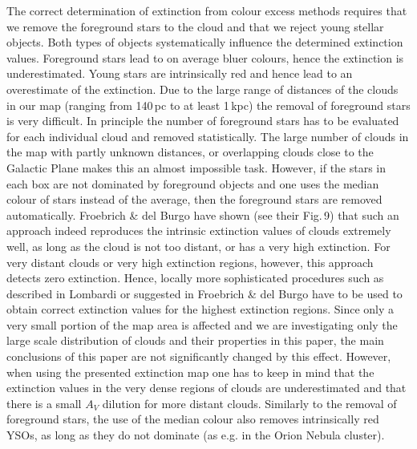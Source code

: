 \documentclass[useAMS,usenatbib]{mn2e}
\begin{document}
The correct determination of extinction from colour excess methods requires that
we remove the foreground stars to the cloud and that we reject young stellar
objects. Both types of objects systematically influence the determined
extinction values. Foreground stars lead to on average bluer colours, hence the
extinction is underestimated. Young stars are intrinsically red and hence lead
to an overestimate of the extinction. Due to the large range of distances of the
clouds in our map (ranging from 140\,pc to at least 1\,kpc) the removal of
foreground stars is very difficult. In principle the number of foreground stars
has to be evaluated for each individual cloud and removed statistically. The
large number of clouds in the map with partly unknown distances, or overlapping
clouds close to the Galactic Plane makes this an almost impossible task.
However, if the stars in each box are not dominated by foreground objects and
one uses the median colour of stars instead of the average, then the foreground
stars are removed automatically. Froebrich \& del Burgo
\cite{2006MNRAS.369.1901F} have shown (see their Fig.\,9) that such an approach
indeed reproduces the intrinsic extinction values of clouds extremely well, as
long as the cloud is not too distant, or has a very high extinction. For very
distant clouds or very high extinction regions, however, this approach detects
zero extinction. Hence, locally more sophisticated procedures such as described
in Lombardi \cite{2005A&A...438..169L} or suggested in Froebrich \& del Burgo
\cite{2006MNRAS.369.1901F} have to be used to obtain correct extinction values
for the highest extinction regions. Since only a very small portion of the map
area is affected and we are investigating only the large scale distribution of
clouds and their properties in this paper, the main  conclusions of this
paper are not significantly changed by this effect. However, when using the
presented extinction map one has to keep in mind that the extinction values in
the very dense regions of clouds are underestimated and that there is a
small $A_V$ dilution for more distant clouds. Similarly to the removal of
foreground stars, the use of the median colour also removes intrinsically red
YSOs, as long as they do not dominate (as e.g. in the Orion Nebula cluster).
\end{document}
